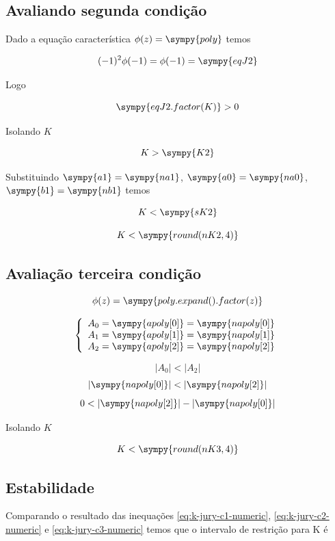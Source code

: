 \documentclass[a4paper,11pt]{article}
\newcommand{\npy}[1]{\sympy{round(#1,4)}}
\begin{document}
\subsection{Avaliando segunda condição}

Dado a equação característica $\phi(z) = \sympy{poly}$ temos

$$(-1)^2\phi(-1) = \phi(-1) = \sympy{eqJ2}$$

Logo

$$\sympy{eqJ2.factor(K)} > 0$$

Isolando $K$

\begin{equation}\label{eq:k-jury-c2}
    K > \sympy{K2}
\end{equation}

Substituindo $\sympy{a1} = \sympy{na1}$, $\sympy{a0} = \sympy{na0}$, $\sympy{b1} = \sympy{nb1}$ temos

$$K < \sympy{sK2}$$

\begin{equation}\label{eq:k-jury-c2-numeric}
    K < \npy{nK2}
\end{equation}

\subsection{Avaliação terceira condição}

$$\phi(z) = \sympy{poly.expand().factor(z)}$$

$$
\left\{\begin{array}{l}
A_0 = \sympy{apoly[0]} = \sympy{napoly[0]}\\
A_1 = \sympy{apoly[1]} = \sympy{napoly[1]}\\
A_2 = \sympy{apoly[2]} = \sympy{napoly[2]}\\
\end{array}
\right.
$$

$$|A_0| < |A_2|$$
$$|\sympy{napoly[0]}| < |\sympy{napoly[2]}|$$
$$0 < |\sympy{napoly[2]}| - |\sympy{napoly[0]}|$$

Isolando $K$

\begin{equation}\label{eq:k-jury-c3-numeric}
    K < \npy{nK3}
\end{equation}

\subsection{Estabilidade}

Comparando o resultado das inequações \ref{eq:k-jury-c1-numeric}, \ref{eq:k-jury-c2-numeric} e \ref{eq:k-jury-c3-numeric} temos que o intervalo de restrição para K é
\end{document}
